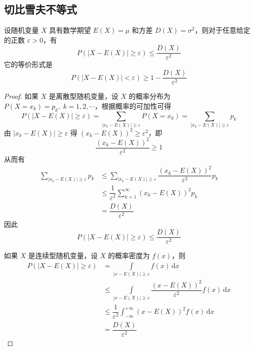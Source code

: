\subsection{切比雪夫不等式}

\begin{theorem}[][切比雪夫不等式]
    \indent 设随机变量 $X$ 具有数学期望 $E(X)=\mu$ 和方差 $D(X) = \sigma^2$，则对于任意给定的正数 $\varepsilon > 0$，有
    $$
    P(|X-E(X)| \geqslant \varepsilon) \leqslant \dfrac{D(X)}{\varepsilon^2}
    $$
    它的等价形式是
    $$
    P(|X-E(X)| < \varepsilon) \geqslant 1 - \dfrac{D(X)}{\varepsilon^2}
    $$
\end{theorem}

\begin{proof}
    如果 $X$ 是离散型随机变量，设 $X$ 的概率分布为 $P(X = x_k) = p_k, \; k=1,2,\cdots$，根据概率的可加性可得
    $$
    P(|X-E(X)| \geqslant \varepsilon) = \sum_{|x_k-E(X)| \geqslant \varepsilon} P(X=x_k) = \sum_{|x_k-E(X)| \geqslant \varepsilon} p_k
    $$
    由 $|x_k-E(X)| \geqslant \varepsilon$ 得 $(x_k-E(X))^2 \geqslant \varepsilon^2$，即
    $$
    \dfrac{(x_k-E(X))^2}{\varepsilon^2} \geqslant 1
    $$
    从而有
    $$
    \begin{aligned}
        \sum_{|x_k-E(X)| \geqslant \varepsilon} p_k & \leqslant \sum_{|x_k-E(X)| \geqslant \varepsilon} \dfrac{(x_k-E(X))^2}{\varepsilon^2} p_k \\
        & \leqslant \dfrac{1}{\varepsilon^2} \sum_{k=1}^{\infty} (x_k-E(X))^2 p_k \\
        &= \dfrac{D(X)}{\varepsilon^2}
    \end{aligned}
    $$
    因此
    $$
    P(|X-E(X)| \geqslant \varepsilon) \leqslant \dfrac{D(X)}{\varepsilon^2}
    $$

    如果 $X$ 是连续型随机变量，设 $X$ 的概率密度为 $f(x)$，则
    $$
    \begin{aligned}
        P(|X-E(X)| \geqslant \varepsilon) &= \underset{|x-E(X)| \geqslant \varepsilon}{\int} f(x) \, \text{d}x \\
         & \leqslant \underset{|x-E(X)| \geqslant \varepsilon}{\int} \dfrac{(x-E(X))^2}{\varepsilon^2} f(x) \, \text{d}x \\
         & \leqslant \dfrac{1}{\varepsilon^2} \int_{-\infty}^{+\infty} (x-E(X))^2 f(x) \, \text{d}x \\
         &= \dfrac{D(X)}{\varepsilon^2}
    \end{aligned}
    $$
\end{proof}

